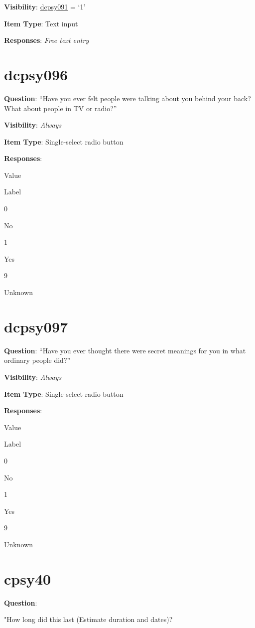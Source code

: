 \documentclass[]{book}
\begin{document}
\textbf{Visibility}: \protect\hyperlink{dcpsy091}{dcpsy091} = `1'

\textbf{Item Type}: Text input

\textbf{Responses}: \emph{Free text entry}

\hypertarget{dcpsy096}{%
\section{dcpsy096}\label{dcpsy096}}

\textbf{Question}: ``Have you ever felt people were talking about you behind your back? What about people in TV or radio?''

\textbf{Visibility}: \emph{Always}

\textbf{Item Type}: Single-select radio button

\textbf{Responses}:

Value

Label

0

No

1

Yes

9

Unknown

\hypertarget{dcpsy097}{%
\section{dcpsy097}\label{dcpsy097}}

\textbf{Question}: ``Have you ever thought there were secret meanings for you in what ordinary people did?''

\textbf{Visibility}: \emph{Always}

\textbf{Item Type}: Single-select radio button

\textbf{Responses}:

Value

Label

0

No

1

Yes

9

Unknown

\hypertarget{cpsy40}{%
\section{cpsy40}\label{cpsy40}}

\textbf{Question}:

"How long did this last (Estimate duration and dates)?
\end{document}
